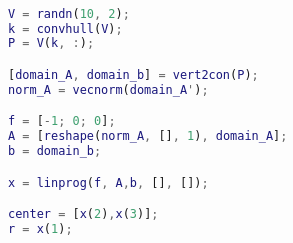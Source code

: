 
\begin{lstlisting}[language=Matlab]

V = randn(10, 2);
k = convhull(V);
P = V(k, :);

[domain_A, domain_b] = vert2con(P);
norm_A = vecnorm(domain_A');

f = [-1; 0; 0];
A = [reshape(norm_A, [], 1), domain_A];
b = domain_b;

x = linprog(f, A,b, [], []);

center = [x(2),x(3)];
r = x(1);
\end{lstlisting}